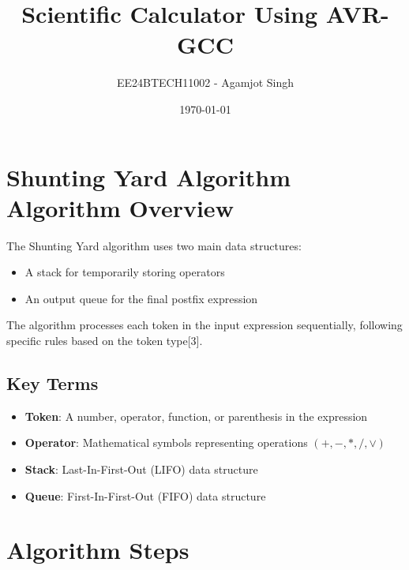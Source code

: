 \documentclass[a4paper,12pt]{article}
\title{Scientific Calculator Using AVR-GCC}
\author{EE24BTECH11002 - Agamjot Singh}
\date{\today}
\begin{document}
\maketitle

\section{Shunting Yard Algorithm Algorithm Overview}

The Shunting Yard algorithm uses two main data structures:
\begin{itemize}
    \item A stack for temporarily storing operators
    \item An output queue for the final postfix expression
\end{itemize}

The algorithm processes each token in the input expression sequentially, following specific rules based on the token type[3].

\subsection{Key Terms}

\begin{itemize}
    \item \textbf{Token}: A number, operator, function, or parenthesis in the expression
    \item \textbf{Operator}: Mathematical symbols representing operations $(+, -, *, /, \vee)$
    \item \textbf{Stack}: Last-In-First-Out (LIFO) data structure
    \item \textbf{Queue}: First-In-First-Out (FIFO) data structure
\end{itemize}

\section{Algorithm Steps}
\end{document}
